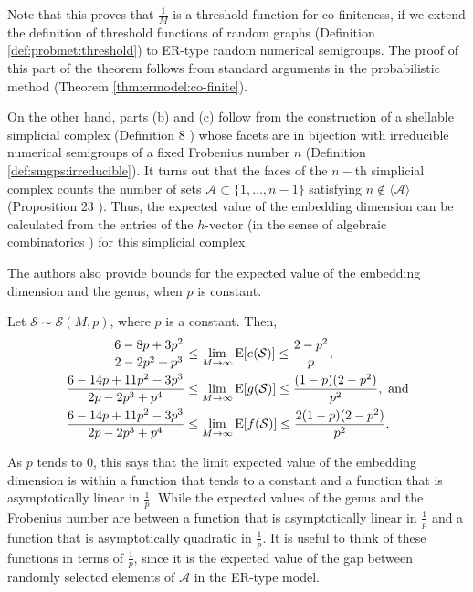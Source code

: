Note that this proves that $\frac{1}{M}$ is a threshold function for co-finiteness, if we extend the definition of threshold functions of random graphs (Definition \ref{def:probmet:threshold}) to ER-type random numerical semigroups. The proof of this part of the theorem follows from standard arguments in the probabilistic method (Theorem \ref{thm:ermodel:co-finite}). \par
On the other hand, parts (b) and (c) follow from the construction of a shellable simplicial complex (Definition 8 \cite{de2018random}) whose facets are in bijection with irreducible numerical semigroups of a fixed Frobenius number $n$ (Definition \ref{def:smgps:irreducible}). It turns out that the faces of the $n-$th simplicial complex counts the number of sets $\mathcal{A} \subset \{1, \ldots, n - 1\}$ satisfying $n \notin \langle\mathcal{A} \rangle$ (Proposition 23 \cite{de2018random}). Thus, the expected value of the embedding dimension can be calculated from the entries of the $h$-vector (in the sense of algebraic combinatorics \cite{stanley2007combinatorics}) for this simplicial complex. \par

The authors also provide bounds for the expected value of the embedding dimension and the genus, when $p$ is constant.

\begin{theorem}\label{thm:ermodel:constantp}
    Let $\mathcal{S} \sim \mathcal{S}(M, p)$, where $p$ is a constant. Then, 
    \begin{align*}
        \frac{6 - 8p + 3p^2}{2 - 2p^2 + p^3} &\leq \lim_{M \to \infty} \mathrm{E}[e(\mathcal{S})] \leq \frac{2 - p^2}{p}, \\
        \frac{6 - 14p + 11p^2 - 3p^3}{2p - 2p^3 + p^4} &\leq \lim_{M \to \infty} \mathrm{E}[g(\mathcal{S})] \leq \frac{(1 - p)(2 - p^2)}{p^2}, \text{ and}\\
        \frac{6 - 14p + 11p^2 - 3p^3}{2p - 2p^3 + p^4} &\leq \lim_{M \to \infty} \mathrm{E}[f(\mathcal{S})] \leq \frac{2(1 - p)(2 - p^2)}{p^2}.
    \end{align*}
\end{theorem}
As $p$ tends to 0, this says that the limit expected value of the embedding dimension is within a function that tends to a constant and a function that is asymptotically linear in $\frac{1}{p}$. While the expected values of the genus and the Frobenius number are between a function that is asymptotically linear in $\frac{1}{p}$ and a function that is asymptotically quadratic in $\frac{1}{p}$. It is useful to think of these functions in terms of $\frac{1}{p}$, since it is the expected value of the gap between randomly selected elements of $\mathcal{A}$ in the ER-type model. \par 

